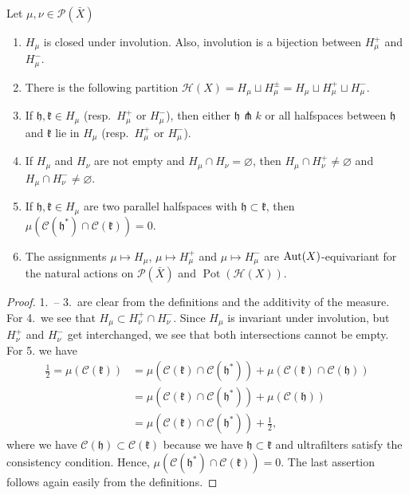 \begin{lemma}[{\cite[Lemma\ 4.6]{MR3509968}}]
  \label{lem:4.6}
  Let \(\mu,\nu \in \mathcal{P}(\bar X)\)
  \begin{enumerate}
  \item \(H_\mu\) is closed under involution. Also, involution is a bijection between \(H_\mu^+\) and \(H_\mu^-\).
  \item There is the following partition \(\mathcal{H}(X) = H_\mu \sqcup H_\mu^\pm = H_\mu \sqcup H_\mu^+ \sqcup H_\mu^-\).
  \item If \(\mathfrak{h, k} \in H_\mu\) (resp.\ \(H_\mu^+\) or \(H_\mu^-\)), then either \(\mathfrak{h} \pitchfork k\) or all halfspaces between \(\mathfrak{h}\) and \(\mathfrak{k}\) lie in \(H_\mu\) (resp.\ \(H_\mu^+\) or \(H_\mu^-\)).
  \item If \(H_\mu\) and \(H_\nu\) are not empty and \(H_\mu \cap H_\nu = \varnothing\), then \(H_\mu \cap H_\nu^+ \neq \varnothing\) and \(H_\mu \cap H_\nu^- \neq \varnothing\).
  \item If \(\mathfrak{h, k}  \in H_\mu\) are two parallel halfspaces with \(\mathfrak{h} \subset \mathfrak{k}\), then \(\mu(\mathcal{C}(\mathfrak{h}^\ast) \cap \mathcal{C}(\mathfrak{k})) = 0\).
  \item The assignments \(\mu \mapsto H_\mu\), \(\mu \mapsto H_\mu^+\) and \(\mu \mapsto H_\mu^-\) are \(\operatorname{Aut}(X)\)-equivariant for the natural actions on \(\mathcal{P}(\bar X)\) and \(\operatorname{Pot}(\mathcal{H}(X))\).
  \end{enumerate}
\end{lemma}

\begin{proof}
  1.\ -- 3.\ are clear from the definitions and the additivity of the measure. For 4.\ we see that \(H_\mu \subset H_\nu^+ \cap H_\nu^-\). Since \(H_\mu\) is invariant under involution, but \(H_\nu^+\) and \(H_\nu^-\) get interchanged, we see that both intersections cannot be empty. For 5. we have
  \begin{align*}
    \frac{1}{2} = \mu(\mathcal{C}(\mathfrak{k}))
    & = \mu(\mathcal{C}(\mathfrak{k}) \cap \mathcal{C}(\mathfrak{h^\ast})) + \mu(\mathcal{C}(\mathfrak{k}) \cap \mathcal{C}(\mathfrak{h}))\\
    & = \mu(\mathcal{C}(\mathfrak{k}) \cap \mathcal{C}(\mathfrak{h^\ast})) + \mu(\mathcal{C}(\mathfrak{h}))\\
    & = \mu(\mathcal{C}(\mathfrak{k}) \cap \mathcal{C}(\mathfrak{h^\ast})) + \frac{1}{2},
  \end{align*}
  where we have \(\mathcal{C}(\mathfrak{h}) \subset \mathcal{C}(\mathfrak{k})\) because we have \(\mathfrak{h} \subset \mathfrak{k}\) and ultrafilters satisfy the consistency condition. Hence, \(\mu(\mathcal{C}(\mathfrak{h^\ast}) \cap \mathcal{C}(\mathfrak{k})) = 0\). The last assertion follows again easily from the definitions.
\end{proof}

